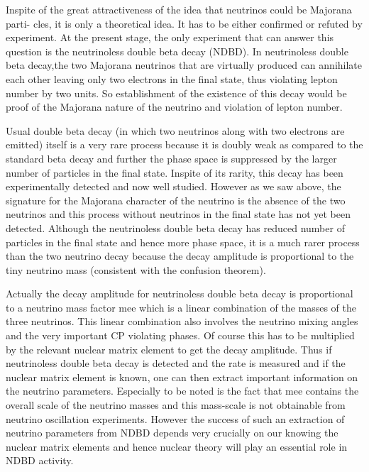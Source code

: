 Inspite of the great attractiveness of the idea that neutrinos could be Majorana parti-
cles, it is only a theoretical idea. It has to be either confirmed or refuted by experiment.
At the present stage, the only experiment that can answer this question is the neutrinoless
double beta decay (NDBD). In neutrinoless double beta decay,the two Majorana neutrinos
that are virtually produced can annihilate each other leaving only two electrons in the final
state, thus violating lepton number by two units. So establishment of the existence of this
decay would be proof of the Majorana nature of the neutrino and violation of lepton number.

\vspace{.2cm}

Usual double beta decay (in which two neutrinos along with two electrons are emitted)
itself is a very rare process because it is doubly weak as compared to the standard beta
decay and further the phase space is suppressed by the larger number of particles in the
final state. Inspite of its rarity, this decay has been experimentally detected and now well
studied. However as we saw above, the signature for the Majorana character of the neutrino
is the absence of the two neutrinos and this process without neutrinos in the final state has
not yet been detected. Although the neutrinoless double beta decay has reduced number of
particles in the final state and hence more phase space, it is a much rarer process than the
two neutrino decay because the decay amplitude is proportional to the tiny neutrino mass
(consistent with the confusion theorem).

Actually the decay amplitude for neutrinoless double beta decay is proportional to a
neutrino mass factor mee which is a linear combination of the masses of the three neutrinos.
This linear combination also involves the neutrino mixing angles and the very important CP
violating phases. Of course this has to be multiplied by the relevant nuclear matrix element
to get the decay amplitude. Thus if neutrinoless double beta decay is detected and the rate
is measured and if the nuclear matrix element is known, one can then extract important
information on the neutrino parameters. Especially to be noted is the fact that mee contains
the overall scale of the neutrino masses and this mass-scale is not obtainable from neutrino
oscillation experiments. However the success of such an extraction of neutrino parameters
from NDBD depends very crucially on our knowing the nuclear matrix elements and hence
nuclear theory will play an essential role in NDBD activity.

